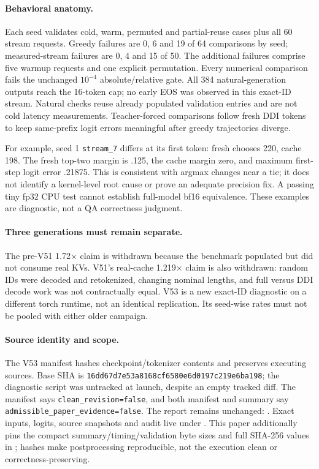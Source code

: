 \paragraph{Behavioral anatomy.}
Each seed validates cold, warm, permuted and partial-reuse cases plus all 60
stream requests. Greedy failures are 0, 6 and 19 of 64 comparisons by seed;
measured-stream failures are 0, 4 and 15 of 50. The additional failures comprise
five warmup requests and one explicit permutation. Every numerical comparison
fails the unchanged $10^{-4}$ absolute/relative gate. All 384 natural-generation
outputs reach the 16-token cap; no early EOS was observed in this exact-ID stream.
Natural checks reuse already populated validation entries and are not cold
latency measurements. Teacher-forced comparisons follow fresh DDI tokens to
keep same-prefix logit errors meaningful after greedy trajectories diverge.

For example, seed 1 \texttt{stream\_7} differs at its first token: fresh chooses
220, cache 198. The fresh top-two margin is .125, the cache margin zero, and
maximum first-step logit error .21875. This is consistent with argmax changes
near a tie; it does not identify a kernel-level root cause or prove an adequate
precision fix. A passing tiny fp32 CPU test cannot establish full-model bf16
equivalence. These examples are diagnostic, not a QA correctness judgment.

\paragraph{Three generations must remain separate.}
The pre-V51 1.72$\times$ claim is withdrawn because the benchmark populated
but did not consume real KVs. V51's real-cache 1.219$\times$ claim is also
withdrawn: random IDs were decoded and retokenized, changing nominal lengths,
and full versus DDI decode work was not contractually equal. V53 is a new
exact-ID diagnostic on a different torch runtime, not an identical replication.
Its seed-wise rates must not be pooled with either older campaign.

\paragraph{Source identity and scope.}
The V53 manifest hashes checkpoint/tokenizer contents and preserves executing
sources. Base SHA is \texttt{16dd67d7e53a8168cf6580e6d0197c219e6ba198}; the
diagnostic script was untracked at launch, despite an empty tracked diff.
The manifest says \texttt{clean\_revision=false}, and both manifest and summary
say \texttt{admissible\_paper\_evidence=false}. The report remains unchanged:
. Exact inputs, logits, source snapshots and audit
live under . This paper additionally pins
the compact summary/timing/validation byte sizes and full SHA-256 values in
; hashes make postprocessing reproducible, not the
execution clean or correctness-preserving.

